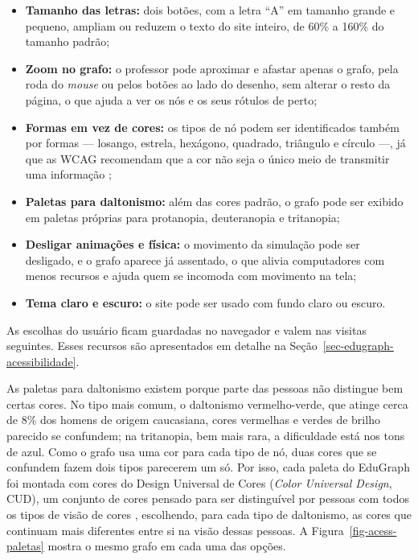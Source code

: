 \begin{itemize}
    \item \textbf{Tamanho das letras:} dois botões, com a letra ``A'' em tamanho grande e pequeno, ampliam ou reduzem o texto do site inteiro, de 60\% a 160\% do tamanho padrão;
    \item \textbf{Zoom no grafo:} o professor pode aproximar e afastar apenas o grafo, pela roda do \textit{mouse} ou pelos botões ao lado do desenho, sem alterar o resto da página, o que ajuda a ver os nós e os seus rótulos de perto;
    \item \textbf{Formas em vez de cores:} os tipos de nó podem ser identificados também por formas --- losango, estrela, hexágono, quadrado, triângulo e círculo ---, já que as WCAG recomendam que a cor não seja o único meio de transmitir uma informação \cite{w3c2024wcag22};
    \item \textbf{Paletas para daltonismo:} além das cores padrão, o grafo pode ser exibido em paletas próprias para protanopia, deuteranopia e tritanopia;
    \item \textbf{Desligar animações e física:} o movimento da simulação pode ser desligado, e o grafo aparece já assentado, o que alivia computadores com menos recursos e ajuda quem se incomoda com movimento na tela;
    \item \textbf{Tema claro e escuro:} o site pode ser usado com fundo claro ou escuro.
\end{itemize}

As escolhas do usuário ficam guardadas no navegador e valem nas visitas seguintes. Esses recursos são apresentados em detalhe na Seção~\ref{sec-edugraph-acessibilidade}.

As paletas para daltonismo existem porque parte das pessoas não distingue bem certas cores. No tipo mais comum, o daltonismo vermelho-verde, que atinge cerca de 8\% dos homens de origem caucasiana, cores vermelhas e verdes de brilho parecido se confundem; na tritanopia, bem mais rara, a dificuldade está nos tons de azul. Como o grafo usa uma cor para cada tipo de nó, duas cores que se confundem fazem dois tipos parecerem um só. Por isso, cada paleta do EduGraph foi montada com cores do Design Universal de Cores (\textit{Color Universal Design}, CUD), um conjunto de cores pensado para ser distinguível por pessoas com todos os tipos de visão de cores \cite{okabe2008cud}, escolhendo, para cada tipo de daltonismo, as cores que continuam mais diferentes entre si na visão dessas pessoas. A Figura~\ref{fig-acess-paletas} mostra o mesmo grafo em cada uma das opções.

